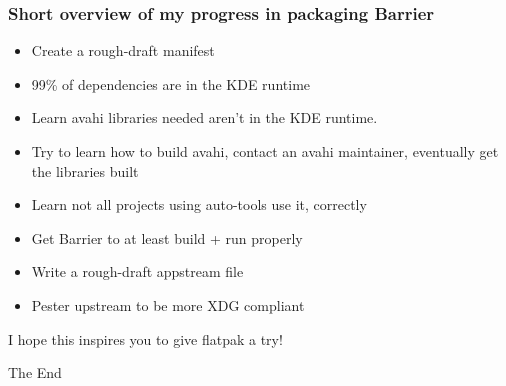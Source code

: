 \documentclass[handout]{beamer}
\begin{document}
\begin{frame}
	\frametitle{Short overview of my progress in packaging Barrier}
	\begin{itemize}
		\item{Create a rough-draft manifest}
		\item{99\% of dependencies are in the KDE runtime}
		\item{Learn avahi libraries needed aren't in the KDE runtime.}
		\item{Try to learn how to build avahi, contact an avahi maintainer, eventually get the libraries built}
		\item{Learn not all projects using auto-tools use it, correctly}
		\item{Get Barrier to at least build + run properly}
		\item{Write a rough-draft appstream file}
		\item{Pester upstream to be more XDG compliant}
	\end{itemize}
\end{frame}

\begin{frame}
	\Large{\centerline{I hope this inspires you to give flatpak a try!}}
\end{frame}


\begin{frame}
\Huge{\centerline{The End}}
\end{frame}

\end{document}
